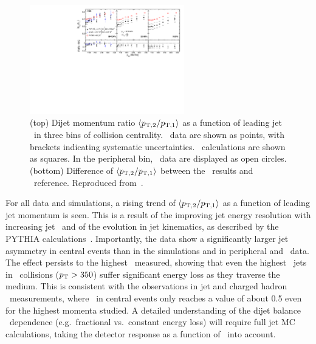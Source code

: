 \begin{figure}[!th]
\begin{center}
\includegraphics[width=0.6\textwidth]{jetfigures/deltaPtOverPt5_lead120_sub30_diff_20120103.pdf}
\caption{(top) Dijet momentum ratio $\langle p_{\rm{T},2}/p_{\rm{T},1} \rangle$ as a function of
leading jet \pT\ in three bins of collision centrality.
\PbPb\ data are shown as points, with brackets indicating systematic uncertainties.  
\PYTHYD\ calculations are shown as squares. In the peripheral bin,
\pp\ data are displayed as open circles.
(bottom) Difference of $\langle p_{\rm{T},2}/p_{\rm{T},1} \rangle$ between the \PbPb\ results and \PYTHYD\ reference.
Reproduced from~\cite{CMS_dijet}.}
\label{fig:GR:CMS_pt_ratio}
\end{center}
\end{figure}

For all data and simulations, a rising trend of $\langle p_{\rm{T},2}/p_{\rm{T},1} \rangle$ as a function
of leading jet momentum is seen. This is a result of the improving jet energy resolution
with increasing jet \pT\ and of the evolution in jet kinematics, as described by the PYTHIA
calculations~\cite{CMS_dijet}. Importantly, the data show a significantly larger jet asymmetry in central events
than in the simulations and in peripheral and \pp\ data. The effect persists to the
highest \pT\ measured, showing that even the highest \pT\ jets in \PbPb\ collisions ($\mbox{$p_{\mathrm{T}}$} > 350$\GeVc)
suffer significant energy loss as they traverse the medium. This is consistent with the 
observations in jet and charged hadron \Raa\ measurements, where \Raa\ in central events 
only reaches a value of about 0.5 even for the highest momenta studied.
A detailed understanding of the dijet balance 
\pT\ dependence (e.g.\ fractional vs.\ constant energy loss) will require full jet MC calculations,
taking the detector response as a function of \pT\ into account.


